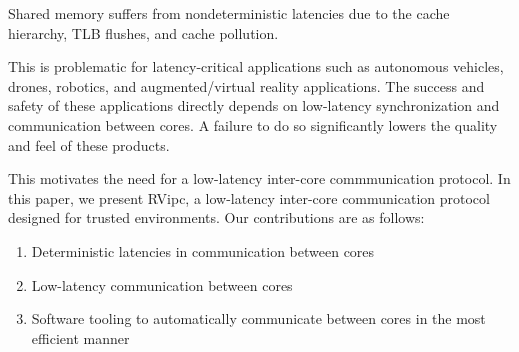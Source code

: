   Shared memory suffers from nondeterministic latencies due to the cache hierarchy, TLB flushes, and cache pollution.

  This is problematic for latency-critical applications such as autonomous vehicles, drones, robotics, and augmented/virtual reality applications. The success and safety of these applications directly depends on low-latency synchronization and communication between cores. A failure to do so significantly lowers the quality and feel of these products. 

  This motivates the need for a low-latency inter-core commmunication protocol. In this paper, we present RVipc, a low-latency inter-core communication protocol designed for trusted environments. Our contributions are as follows:

  \begin{enumerate}
    \item Deterministic latencies in communication between cores
    \item Low-latency communication between cores 
    \item Software tooling to automatically communicate between cores in the most efficient manner
  \end{enumerate}
